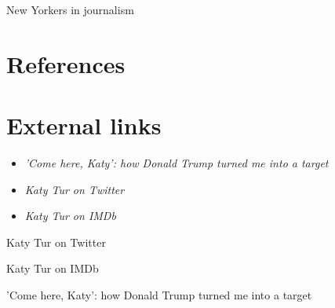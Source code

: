 New Yorkers in journalism

\section{References}\label{references}

\section{External links}\label{external-links}

\begin{itemize}
\item
  \emph{'Come here, Katy': how Donald Trump turned me into a target}
\item
  \emph{Katy Tur on Twitter}
\item
  \emph{Katy Tur on IMDb}
\end{itemize}

Katy Tur on Twitter

Katy Tur on IMDb

'Come here, Katy': how Donald Trump turned me into a target
